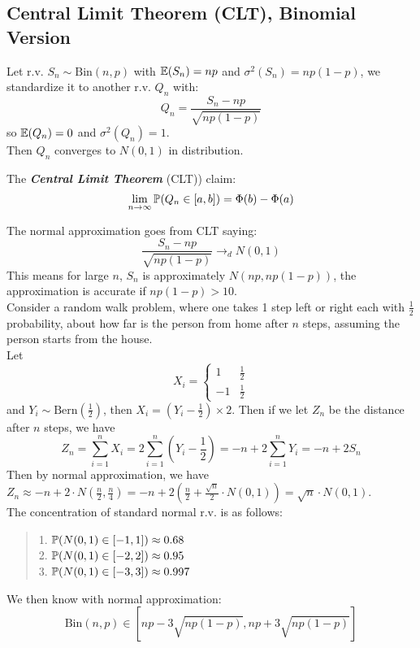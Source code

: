 \subsection{Central Limit Theorem (CLT), Binomial Version}
Let r.v. $S_n \sim \text{Bin}(n, p)$ with $\mathbb{E}(S_n) = np$ and $\sigma^2(S_n) = np(1-p)$, we standardize it to another r.v. $Q_n$ with:
$$Q_n = \frac{S_n - np}{\sqrt{np(1-p)}}$$
so $\mathbb{E}(Q_n) = 0$ and $\sigma^2(Q_n) = 1$. \\
Then $Q_n$ converges to $N(0, 1)$ in distribution.
\begin{theorem}
    The \textbf{\textit{Central Limit Theorem}} (CLT)) claim:
    $$\lim_{n \to \infty} \mathbb{P}(Q_n \in [a, b]) = \Phi(b) - \Phi(a)$$
\end{theorem}
The normal approximation goes from CLT saying:
$$\frac{S_n - np}{\sqrt{np(1-p)}} \to_d N(0, 1)$$
This means for large $n$, $S_n$ is approximately $N(np, np(1-p))$, the approximation is accurate if $np(1-p)>10$. \\
Consider a random walk problem, where one takes 1 step left or right each with $\frac{1}{2}$ probability, about how far is the person from home after $n$ steps, assuming the person starts from the house. \\
Let
$$X_i = \begin{cases}
    1 & \frac{1}{2} \\
    -1 & \frac{1}{2}
\end{cases}$$
and $Y_i \sim \text{Bern}(\frac{1}{2})$, then $X_i = (Y_i - \frac{1}{2}) \times 2$. Then if we let $Z_n$ be the distance after $n$ steps, we have
$$Z_n = \sum_{i = 1}^{n} X_i = 2 \sum_{i = 1}^{n} (Y_i - \frac{1}{2}) = -n + 2\sum_{i = 1}^{n} Y_i = -n + 2S_n$$
Then by normal approximation, we have $Z_n \approx -n + 2 \cdot N(\frac{n}{2}, \frac{n}{4}) = -n + 2(\frac{n}{2} + \frac{\sqrt{n}}{2} \cdot N(0, 1)) = \sqrt{n} \cdot N(0, 1)$. \\
The concentration of standard normal r.v. is as follows:
\begin{quote}
    1. $\mathbb{P}(N(0, 1) \in [-1, 1]) \approx 0.68$ \\
    2. $\mathbb{P}(N(0, 1) \in [-2, 2]) \approx 0.95$ \\
    3. $\mathbb{P}(N(0, 1) \in [-3, 3]) \approx 0.997$
\end{quote}
We then know with normal approximation:
$$\text{Bin}(n, p) \in [np - 3\sqrt{np(1-p)}, np + 3\sqrt{np(1-p)}]$$

